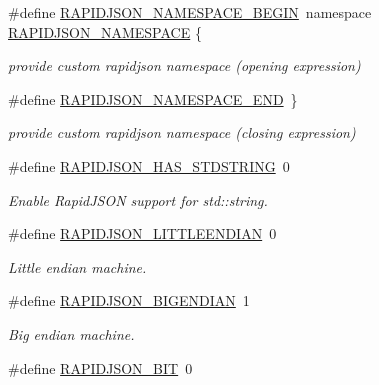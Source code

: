 \begin{DoxyCompactItemize}
\#define \hyperlink{a00833_gad3806c8251fdc7da9618b7e922674ffc}{R\+A\+P\+I\+D\+J\+S\+O\+N\+\_\+\+N\+A\+M\+E\+S\+P\+A\+C\+E\+\_\+\+B\+E\+G\+IN}~namespace \hyperlink{a00833_ga743a79d3af927391fe3eb5c979136899}{R\+A\+P\+I\+D\+J\+S\+O\+N\+\_\+\+N\+A\+M\+E\+S\+P\+A\+CE} \{
\begin{DoxyCompactList}\small\item\em provide custom rapidjson namespace (opening expression) \end{DoxyCompactList}\item 
\#define \hyperlink{a00833_gaf18f052a98b9f5df5448d39484b743c1}{R\+A\+P\+I\+D\+J\+S\+O\+N\+\_\+\+N\+A\+M\+E\+S\+P\+A\+C\+E\+\_\+\+E\+ND}~\}
\begin{DoxyCompactList}\small\item\em provide custom rapidjson namespace (closing expression) \end{DoxyCompactList}\item 
\#define \hyperlink{a00833_ga2f2eef0ee4477f3fe5874703a66e997f}{R\+A\+P\+I\+D\+J\+S\+O\+N\+\_\+\+H\+A\+S\+\_\+\+S\+T\+D\+S\+T\+R\+I\+NG}~0
\begin{DoxyCompactList}\small\item\em Enable Rapid\+J\+S\+ON support for {\ttfamily std\+::string}. \end{DoxyCompactList}\item 
\#define \hyperlink{a00677_addcc0c3607c5790f35cc4c15885ff97c}{R\+A\+P\+I\+D\+J\+S\+O\+N\+\_\+\+L\+I\+T\+T\+L\+E\+E\+N\+D\+I\+AN}~0\hypertarget{a00677_addcc0c3607c5790f35cc4c15885ff97c}{}\label{a00677_addcc0c3607c5790f35cc4c15885ff97c}

\begin{DoxyCompactList}\small\item\em Little endian machine. \end{DoxyCompactList}\item 
\#define \hyperlink{a00677_ac7951ebf8a2624ab85d2dcd3ec7af974}{R\+A\+P\+I\+D\+J\+S\+O\+N\+\_\+\+B\+I\+G\+E\+N\+D\+I\+AN}~1\hypertarget{a00677_ac7951ebf8a2624ab85d2dcd3ec7af974}{}\label{a00677_ac7951ebf8a2624ab85d2dcd3ec7af974}

\begin{DoxyCompactList}\small\item\em Big endian machine. \end{DoxyCompactList}\item 
\#define \hyperlink{a00677_a93973847cb99354b6b5bb5605aa7fe52}{R\+A\+P\+I\+D\+J\+S\+O\+N\+\_\+B\+IT}~0\hypertarget{a00677_a93973847cb99354b6b5bb5605aa7fe52}{}\label{a00677_a93973847cb99354b6b5bb5605aa7fe52}


\end{DoxyCompactItemize}
